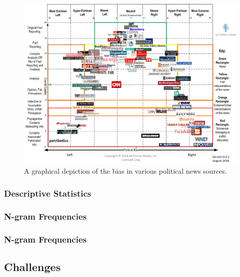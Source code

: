 \documentclass{beamer}
\begin{document}
    \begin{frame}
    	\begin{figure}[H]
    		\includegraphics[width=\textwidth]{figures/images/news-bias.jpg}
    		\caption{A graphical depiction of the bias in various political news sources.}
    		\label{fig:news-bias}
    	\end{figure}
    \end{frame}

	\begin{frame}
		\frametitle{Descriptive Statistics}
		
	\end{frame}

	\begin{frame}
		\frametitle{N-gram Frequencies}
		
	\end{frame}

	\begin{frame}
		\frametitle{N-gram Frequencies}
		
	\end{frame}

    \subsection{Challenges}
    
\end{document}
